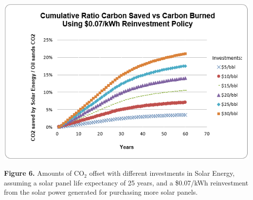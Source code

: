 \documentclass[11pt]{article}
\begin{document}
\begin{center}
\includegraphics{g6.png}
\end{center}

\begin{center}
{\bf Figure 6.} Amounts of CO$_2$ offset with different investments in Solar Energy, assuming a solar panel life expectancy of 25 years, and a \$0.07/kWh reinvestment from the solar power generated for purchasing more solar panels.  
\end{center}
\end{document}
